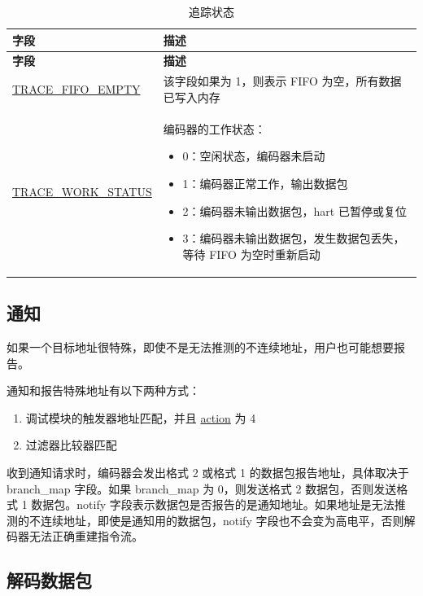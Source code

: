 \documentclass[main\_\_CN.tex]{subfiles}
\begin{document}
\begin{longtable}[c]{ |l|L{10cm}| }
    \caption{追踪状态}
    \label{riscvtracenc-trace-status}
    \\\hline{}
    \textbf{字段} & \textbf{描述} \\\hline
    \endfirsthead

    \textbf{字段} & \textbf{描述} \\\hline
    \endhead
    \endfoot
    \endlastfoot

    \hyperref[fielddesc:TRACEFIFOEMPTY]{TRACE\_FIFO\_EMPTY} & 该字段如果为 1，则表示 FIFO 为空，所有数据已写入内存 \\\hline
    \hyperref[fielddesc:TRACEWORKSTATUS]{TRACE\_WORK\_STATUS} & 编码器的工作状态：
    \begin{itemize}
        \item 0：空闲状态，编码器未启动
        \item 1：编码器正常工作，输出数据包
        \item 2：编码器未输出数据包，hart 已暂停或复位
        \item 3：编码器未输出数据包，发生数据包丢失，等待 FIFO 为空时重新启动
    \end{itemize}
    \\\hline

\end{longtable}

\subsection{通知}

如果一个目标地址很特殊，即使不是无法推测的不连续地址，用户也可能想要报告。

通知和报告特殊地址有以下两种方式：
\begin{enumerate}
    \item 调试模块的触发器地址匹配，并且 \hyperref[fielddesc:MCONTROLACTION]{action} 为 4
    \item 过滤器比较器匹配
\end{enumerate}

收到通知请求时，编码器会发出格式 2 或格式 1 的数据包报告地址，具体取决于 branch\_map 字段。如果 branch\_map 为 0，则发送格式 2 数据包，否则发送格式 1 数据包。notify 字段表示数据包是否报告的是通知地址。如果地址是无法推测的不连续地址，即使是通知用的数据包，notify 字段也不会变为高电平，否则解码器无法正确重建指令流。

\subsection{解码数据包}
\end{document}
